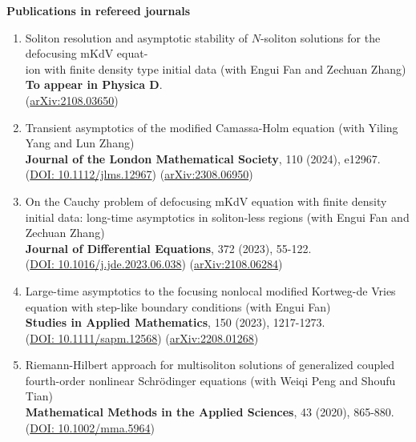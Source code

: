\documentclass[letterpaper,11pt,UTF8]{ctexart}
\begin{document}
\large\textbf{Publications in refereed journals}
\begin{flushleft}
    \begin{enumerate}[1.]
    \item Soliton resolution and asymptotic stability of $N$-soliton solutions for the defocusing mKdV equat-\\ion with finite density type initial data (with Engui Fan and Zechuan Zhang)\\ 
    {\bf To appear in Physica D}. \\
    (\href{https://arxiv.org/abs/2108.03650}{arXiv:2108.03650})

    \item Transient asymptotics of the modified Camassa-Holm equation (with Yiling Yang and Lun Zhang) \\
    {\bf Journal of the London Mathematical Society}, 110 (2024), e12967. \\
    (\href{https://londmathsoc.onlinelibrary.wiley.com/doi/10.1112/jlms.12967}{DOI: 10.1112/jlms.12967}) (\href{https://arxiv.org/abs/2308.06950}{arXiv:2308.06950})

    \item On the Cauchy problem of defocusing mKdV equation with finite density initial data: long-time asymptotics in soliton-less regions (with Engui Fan and Zechuan Zhang)\\
    {\bf Journal of Differential Equations}, 372 (2023), 55-122.\\
    (\href{https://www.sciencedirect.com/science/article/pii/S002203962300445X?via%3Dihub}{DOI: 10.1016/j.jde.2023.06.038}) (\href{https://arxiv.org/abs/2108.06284}{arXiv:2108.06284})

    \item Large-time asymptotics to the focusing nonlocal modified Kortweg-de Vries equation with step-like boundary conditions (with Engui Fan)\\
    {\bf Studies in Applied Mathematics}, 150 (2023), 1217-1273. \\
    (\href{https://onlinelibrary.wiley.com/doi/10.1111/sapm.12568}{DOI: 10.1111/sapm.12568}) (\href{https://arxiv.org/abs/2208.01268}{arXiv:2208.01268})

    \item Riemann-Hilbert approach for multisoliton solutions of generalized coupled fourth-order nonlinear Schr\"odinger equations
    (with Weiqi Peng and Shoufu Tian)\\
    {\bf Mathematical Methods in the Applied Sciences}, 43 (2020), 865-880.\\
    (\href{https://onlinelibrary.wiley.com/doi/10.1002/mma.5964}{DOI: 10.1002/mma.5964})
    \end{enumerate}
\end{flushleft}
\vspace{3mm}
\end{document}
